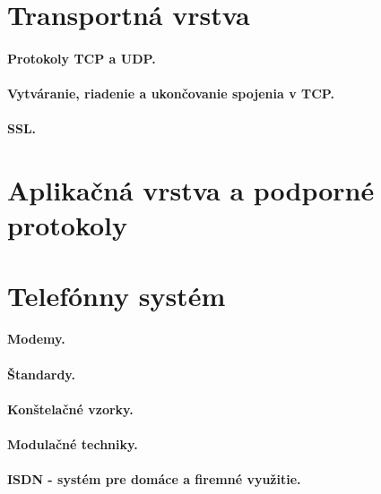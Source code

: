 {{\section{Transportná vrstva}        
\paragraph{Protokoly TCP a UDP.}   
\paragraph{Vytváranie, riadenie a ukončovanie spojenia v TCP.} 
\paragraph{SSL.}                             
\section{Aplikačná vrstva a podporné protokoly}            
\section{Telefónny systém}    
\paragraph{Modemy.}      
\paragraph{Štandardy.}    
\paragraph{Konštelačné vzorky.}  
\paragraph{Modulačné techniky.}   
\paragraph{ISDN - systém pre domáce a firemné využitie.}  
}}

